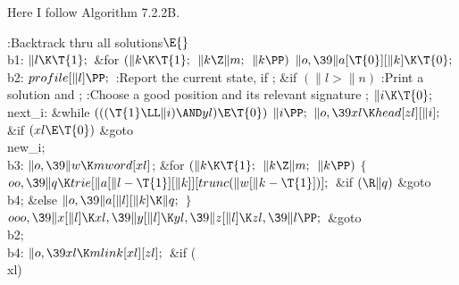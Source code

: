 Here I follow Algorithm 7.2.2B.

\Y\B\4:Backtrack thru all solutions\X${}\E{}$\6
\4\\{b1}:\5
${}\|l\K\T{1};{}$\6
\&{for} ${}(\|k\K\T{1};{}$ ${}\|k\Z\|m;{}$ ${}\|k\PP){}$\1\5
${}\|o,\39\|a[\T{0}][\|k]\K\T{0};{}$\2\6
\4\\{b2}:\5
${}\\{profile}[\|l]\PP;{}$\6
:Report the current state, if \X;\6
\&{if} ${}(\|l>\|n){}$\1\5
:Print a solution and \X;\2\6
:Choose a good position  and its relevant signature %
\X;\6
${}\|i\K\T{0};{}$\6
\4\\{next\_i}:\5
\&{while} ${}(((\T{1}\LL\|i)\AND\\{yl})\E\T{0}){}$\1\5
${}\|i\PP;{}$\2\6
${}\|o,\39\\{xl}\K\\{head}[\\{zl}][\|i];{}$\6
\&{if} ${}(\\{xl}\E\T{0}){}$\1\5
\&{goto} \\{new\_i};\2\6
\4\\{b3}:\5
${}\|o,\39\|w\K\\{mword}[\\{xl}]{}$;\6
\&{for} ${}(\|k\K\T{1};{}$ ${}\|k\Z\|m;{}$ ${}\|k\PP){}$\5
${}\{{}$\1\6
${}\\{oo},\39\|q\K\\{trie}[\|a[\|l-\T{1}][\|k]][\\{trunc}(\|w[\|k-\T{1}])];{}$\6
\&{if} ${}(\R\|q){}$\1\5
\&{goto} \\{b4};\5
\2\&{else}\1\5
${}\|o,\39\|a[\|l][\|k]\K\|q;{}$\2\6
\4${}\}{}$\2\6
${}\\{ooo},\39\|x[\|l]\K\\{xl},\39\|y[\|l]\K\\{yl},\39\|z[\|l]\K\\{zl},\39\|l%
\PP;{}$\6
\&{goto} \\{b2};\6
\4\\{b4}:\5
${}\|o,\39\\{xl}\K\\{mlink}[\\{xl}][\\{zl}];{}$\6
\&{if} (\\{xl})\1\5
